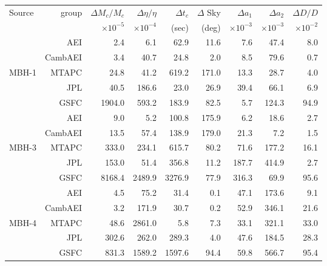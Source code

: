 \documentclass{iopart}
\begin{document}
\begin{table}
\begin{center}
\begin{tabular}{lr|rrrrrrr}
\hline
Source & group & $\Delta M_{c}/ M_{c}  $& $\Delta \eta/ \eta $ & $ \Delta t_{c} $ &  $ \Delta $ Sky  & $ \Delta a_{1} $ & $ \Delta a_{2}  $ &  $\Delta D / D$ \\
 & & $\times 10^{-5}$ & $\times 10^{-4}$ & (sec) & (deg) & $\times 10^{-3}$ & $\times 10^{-3}$ & $\times10^{-2}$   \\

\hline
             & AEI            &         2.4 &        6.1 &   62.9 &   11.6 &    7.6 &   47.4 &   8.0 \\
             & CambAEI &         3.4 &     40.7 &   24.8 &      2.0 &    8.5 &   79.6 &   0.7    \\
MBH-1 & MTAPC    &       24.8 &     41.2 & 619.2 & 171.0 & 13.3 &   28.7 &    4.0  \\
              & JPL           &       40.5 &  186.6 &   23.0 &    26.9 & 39.4 &   66.1 &    6.9  \\
              & GSFC       &  1904.0 &  593.2 & 183.9 &    82.5 &   5.7 & 124.3 &  94.9  \\

\hline
               & AEI            &       9.0 &         5.2 &    100.8 & 175.9 &      6.2 &    18.6 &   2.7  \\
               & CambAEI &     13.5 &      57.4 &    138.9 & 179.0 &    21.3 &      7.2 &   1.5 \\
MBH-3  & MTAPC    &   333.0 &    234.1 &    615.7 &   80.2 &    71.6 & 177.2 & 16.1  \\
               & JPL           &   153.0 &      51.4 &    356.8 &   11.2 & 187.7 & 414.9 &    2.7  \\
               & GSFC       & 8168.4 & 2489.9 & 3276.9 &    77.9 & 316.3 &   69.9 &  95.6 \\

\hline
                & AEI            &      4.5 &      75.2 &       31.4 &   0.1 & 47.1 &173.6  &    9.1 \\
                & CambAEI &      3.2 &    171.9 &      30.7 &   0.2 & 52.9 & 346.1 &  21.6 \\
MBH-4   & MTAPC    &     48.6 & 2861.0 &        5.8 &   7.3 & 33.1 & 321.1 & 33.0  \\
                & JPL           &  302.6 &    262.0 &   289.3 &   4.0 & 47.6 & 184.5 & 28.3  \\
                & GSFC       &  831.3 & 1589.2 & 1597.6 & 94.4 & 59.8 & 566.7 & 95.4  \\


\end{tabular}
\end{center}
\end{table}
\end{document}
